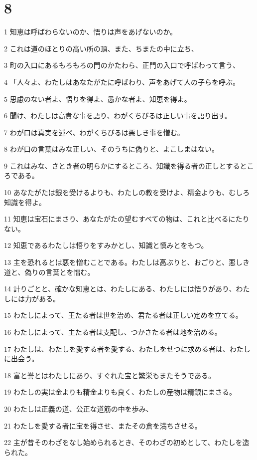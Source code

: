 \chapter{8}

\par 1 知恵は呼ばわらないのか、悟りは声をあげないのか。
\par 2 これは道のほとりの高い所の頂、また、ちまたの中に立ち、
\par 3 町の入口にあるもろもろの門のかたわら、正門の入口で呼ばわって言う、
\par 4 「人々よ、わたしはあなたがたに呼ばわり、声をあげて人の子らを呼ぶ。
\par 5 思慮のない者よ、悟りを得よ、愚かな者よ、知恵を得よ。
\par 6 聞け、わたしは高貴な事を語り、わがくちびるは正しい事を語り出す。
\par 7 わが口は真実を述べ、わがくちびるは悪しき事を憎む。
\par 8 わが口の言葉はみな正しい、そのうちに偽りと、よこしまはない。
\par 9 これはみな、さとき者の明らかにするところ、知識を得る者の正しとするところである。
\par 10 あなたがたは銀を受けるよりも、わたしの教を受けよ、精金よりも、むしろ知識を得よ。
\par 11 知恵は宝石にまさり、あなたがたの望むすべての物は、これと比べるにたりない。
\par 12 知恵であるわたしは悟りをすみかとし、知識と慎みとをもつ。
\par 13 主を恐れるとは悪を憎むことである。わたしは高ぶりと、おごりと、悪しき道と、偽りの言葉とを憎む。
\par 14 計りごとと、確かな知恵とは、わたしにある、わたしには悟りがあり、わたしには力がある。
\par 15 わたしによって、王たる者は世を治め、君たる者は正しい定めを立てる。
\par 16 わたしによって、主たる者は支配し、つかさたる者は地を治める。
\par 17 わたしは、わたしを愛する者を愛する、わたしをせつに求める者は、わたしに出会う。
\par 18 富と誉とはわたしにあり、すぐれた宝と繁栄もまたそうである。
\par 19 わたしの実は金よりも精金よりも良く、わたしの産物は精銀にまさる。
\par 20 わたしは正義の道、公正な道筋の中を歩み、
\par 21 わたしを愛する者に宝を得させ、またその倉を満ちさせる。
\par 22 主が昔そのわざをなし始められるとき、そのわざの初めとして、わたしを造られた。
